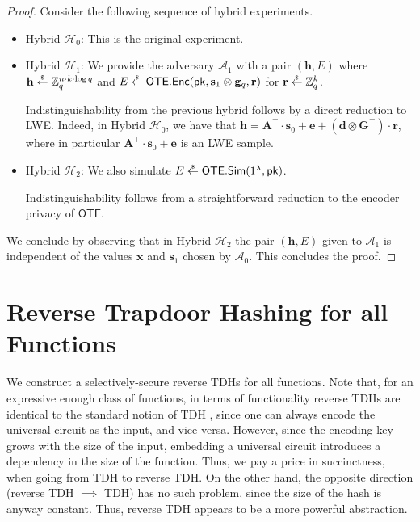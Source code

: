 \documentclass{theoretics}
\newcommand{\getsr}{\overset{\raisebox{-1pt}{$\scriptscriptstyle \$$}}{\gets}}
\newcommand{\sample}{\getsr}
\newcommand{\OTE}{\mathsf{OTE}}
\newcommand{\Z}{\mathbb{Z}}
\renewcommand{\sec}{\ensuremath{\lambda}}
\newcommand{\Sim}{\mathsf{Sim}}
\newcommand{\Adv}{\mathcal{A}}
\newcommand{\algofont}[1]{\ensuremath{\mathsf{#1}}}
\newcommand{\Enc}{{\algofont{Enc}}}
\newcommand{\pk}{{\mathsf{pk}}}
\newcommand\bbbone{1}
\begin{document}
\begin{proof}
Consider the following sequence of hybrid experiments.
\begin{itemize}
    \item Hybrid $\mathcal{H}_0$: This is the original experiment.
    \item Hybrid $\mathcal{H}_1$: We provide the adversary $\Adv_1$ with a pair $(\mathbf{h}, E)$ where $\mathbf{h}\sample\Z_q^{n\cdot k\cdot \log q}$ and $E\sample \OTE.\Enc(\pk, \mathbf{s}_1\otimes \mathbf{g}_q, \mathbf{r})$ for $\mathbf{r}\sample\Z_q^k$.

    Indistinguishability from the previous hybrid follows by a direct reduction to LWE. Indeed, in Hybrid $\mathcal{H}_0$, we have that $\mathbf{h} =\mathbf{A}^\intercal\cdot \mathbf{s}_0+\mathbf{e}+(\mathbf{d}\otimes\mathbf{G}^\intercal)\cdot \mathbf{r}$, where in particular $\mathbf{A}^\intercal\cdot \mathbf{s}_0+\mathbf{e}$ is an LWE sample.
    
    \item Hybrid $\mathcal{H}_2$: We also simulate $E\sample \OTE.\Sim(\bbbone^\sec, \pk)$.

    Indistinguishability follows from a straightforward reduction to the encoder privacy of $\OTE$.
\end{itemize}
We conclude by observing that in Hybrid $\mathcal{H}_2$ the pair $(\mathbf{h}, E)$ given to $\Adv_1$ is independent of the values $\mathbf{x}$ and $\mathbf{s}_1$ chosen by $\Adv_0$. This concludes the proof.
\end{proof}

\section{Reverse Trapdoor Hashing for all Functions}\label{sec:rtdh}

We construct a selectively-secure reverse TDHs for all functions. Note that, for an expressive enough class of functions, in terms of functionality reverse TDHs are identical to the standard notion of TDH \cite{C:DGIMMO19}, since one can always encode the universal circuit as the input, and vice-versa.
However, since the encoding key grows with the size of the input, embedding a universal circuit introduces a dependency in the size of the function. Thus, we pay a price in succinctness, when going from TDH to reverse TDH. On the other hand, the opposite direction (reverse TDH $\implies$ TDH) has no such problem, since the size of the hash is anyway constant. Thus, reverse TDH appears to be a more powerful abstraction.
\end{document}
